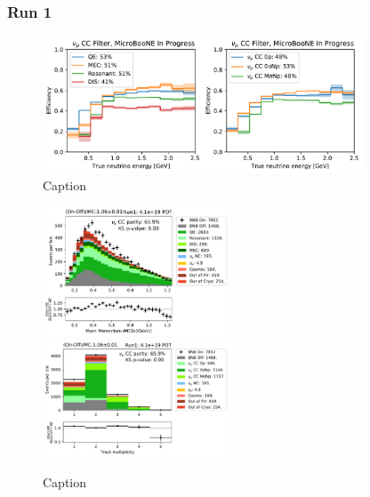 
\subsubsection{Run 1}
\label{sssec:NuMUCCsel:INC:Run1}


\begin{figure}[H]
    \centering
    \includegraphics[width=0.85\textwidth]{NuMuCCsel/Images/run1/numu_efficiency_run1.pdf}
    \caption{Caption}
    \label{fig:numu_eff_r1}
\end{figure}

\begin{figure}[H]
    \centering
    \includegraphics[width=0.495\textwidth]{NuMuCCsel/Images/run1/numu_mcsmom_run1.pdf} \hfill
    \includegraphics[width=0.495\textwidth]{NuMuCCsel/Images/run1/numu_vtxntrack_cat_run1.pdf}
    \caption{Caption}
    \label{fig:numu_mcs}
\end{figure}

